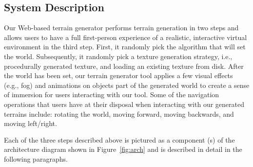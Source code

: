 \subsection{System Description}
Our Web-based terrain generator performs terrain generation in two steps and allows users to have a full first-person experience of a realistic, interactive virtual environment in the third step. First, it randomly pick the algorithm that will set the world. Subsequently, it randomly pick a texture generation strategy, i.e., procedurally generated texture, and loading an existing texture from disk. After the world has been set, our terrain generator tool applies a few visual effects (e.g., fog) and animations on objects part of the generated world to create a sense of immersion for users interacting with our tool. Some of the navigation operations that users have at their disposal when interacting with our generated terrains include: rotating the world, moving forward, moving backwards, and moving left/right.  

Each of the three steps described above is pictured as a component (s) of the architecture diagram shown in Figure~\ref{fig:arch} and is described in detail in the following paragraphs.

